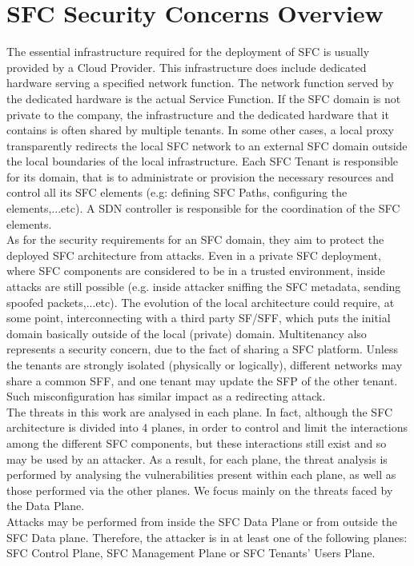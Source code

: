 \section{SFC Security Concerns Overview \cite{nano4}}
The essential infrastructure required for the deployment of SFC is usually provided by a Cloud Provider. This infrastructure does include dedicated hardware serving a specified network function. The network function served by the dedicated hardware is the actual Service Function. If the SFC domain is not private to the company, the infrastructure and the dedicated hardware that it contains is often shared by multiple tenants. In some other cases, a local proxy transparently redirects the local SFC network to an external SFC domain outside the local boundaries of the local infrastructure. Each SFC Tenant is responsible for its domain, that is to administrate or provision the necessary resources and control all its SFC elements (e.g: defining SFC Paths, configuring the elements,...etc). A SDN controller is responsible for the coordination of the SFC elements.\\
As for the security requirements for an SFC domain, they aim to protect the deployed SFC architecture from attacks. Even in a private SFC deployment, where SFC components are considered to be in a trusted environment, inside attacks are still possible (e.g. inside attacker sniffing the SFC metadata, sending spoofed packets,...etc). The evolution of the local architecture could require, at some point, interconnecting with a third party SF/SFF, which puts the initial domain basically outside of the local (private) domain. Multitenancy also represents a security concern, due to the fact of sharing a SFC platform. Unless the tenants are strongly isolated (physically or logically), different networks may share a common SFF, and one tenant may update the SFP of the other tenant. Such misconfiguration has similar impact as a redirecting attack.\\
The threats in this work are analysed in each plane. In fact, although the SFC architecture is divided into 4 planes, in order to control and limit the interactions among the different SFC components, but these interactions still exist and so may be used by an attacker. As a result, for each plane, the threat analysis is performed by analysing the vulnerabilities present within each plane, as well as those performed via the other planes. We focus mainly on the threats faced by the Data Plane.\\
Attacks may be performed from inside the SFC Data Plane or from outside the SFC Data plane. Therefore, the attacker is in at least one of the following planes: SFC Control Plane, SFC Management Plane or SFC Tenants’ Users Plane.
